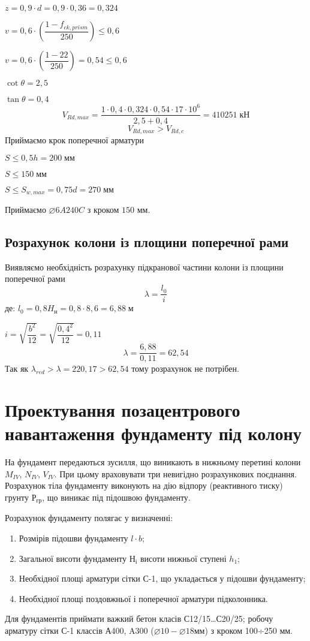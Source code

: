 \documentclass[a4paper,14pt]{article}
\begin{document}
\begin{enumerate}
        $z = 0,9 \cdot d = 0,9 \cdot 0,36 = 0,324$

        $v = 0,6 \cdot \left(\dfrac{1 - f_{ck,prism}}{250}\right) \leq 0,6$

        $v = 0,6 \cdot \left(\dfrac{1 - 22}{250}\right) = 0,54 \leq 0,6$

        $\cot\theta = 2,5$

        $\tan\theta = 0,4$
        $$ V_{Rd,max} = \dfrac{1 \cdot 0,4 \cdot 0,324 \cdot 0,54 \cdot 17 \cdot 10^6}{2,5 + 0,4} = 410251\;\textit{кН}$$
        $$V_{Rd,max} > V_{Rd,c}$$
        Приймаємо крок поперечної арматури

        $S \leq 0,5h = 200\;\textit{мм}$

        $S \leq 150\;\textit{мм}$
        
        $S \leq S_{w,max} = 0,75d = 270\;\textit{мм}$
        
        Приймаємо $\varnothing6A240C$ з кроком $150$ мм.
    \end{enumerate}
\subsection{Розрахунок колони із площини поперечної рами}
Виявляємо необхідність розрахунку підкранової частини колони із площини поперечної рами 
\begin{equation}
    \lambda = \dfrac{l_0}{i}
\end{equation}
де: $l_0 = 0,8H_\textit{н} = 0,8 \cdot 8,6 = 6,88\;\textit{м}$

$i=\sqrt{\dfrac{b^2}{12}} = \sqrt{\dfrac{0,4^2}{12}} = 0,11$
$$\lambda = \dfrac{6,88}{0,11} = 62,54$$
Так як $\lambda_{red}>\lambda=220,17>62,54$ тому розрахунок не потрібен.
\newpage
\section{Проектування позацентрового навантаження фундаменту під колону}

На фундамент передаються зусилля, що виникають в нижньому перетині колони $M_{IV}$, $N_{IV}$, $V_{IV}$. При цьому враховувати три невигідно розрахункових поєднання. Розрахунок тіла фундаменту виконують на дію відпору (реактивного тиску) грунту $Р_{гр}$, що виникає під підошвою фундаменту.


Розрахунок фундаменту полягає у визначенні:
\begin{enumerate}

\item Розмірів підошви фундаменту $l \cdot b$;

\item Загальної висоти фундаменту $Н_і$ висоти нижньої ступені $h_1$;

\item Необхідної площі арматури сітки С-1, що укладається у підошви фундаменту;

\item Необхідної площі поздовжньої і поперечної арматури підколонника.
\end{enumerate}
    Для фундаментів приймати важкий бетон класів С12/15…С20/25; робочу арматуру сітки С-1 классів А400, A300 ($\varnothing10-\varnothing18 \textit{мм}$) з кроком 100÷250 мм.
\end{document}
